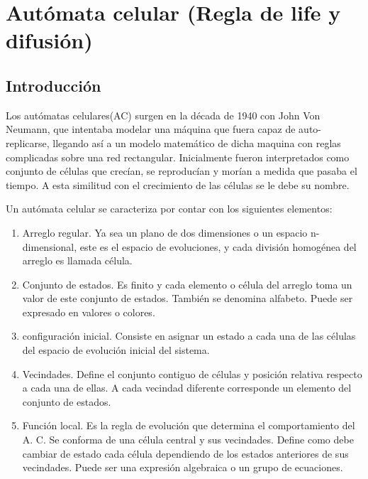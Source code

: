 \section{Autómata celular (Regla de life y difusión)}
\subsection{Introducción}
Los autómatas celulares(AC) surgen en la década de 1940 con John Von Neumann, que intentaba modelar una máquina que fuera capaz de auto-replicarse, llegando así a un modelo matemático de dicha maquina con reglas complicadas sobre una red rectangular. Inicialmente fueron interpretados como conjunto de células que crecían, se reproducían y morían a medida que pasaba el tiempo. A esta similitud con el crecimiento de las células se le debe su nombre.\cite{PAGINA}

Un autómata celular se caracteriza por contar con los siguientes elementos:
\begin{enumerate}
 \item Arreglo regular. Ya sea un plano de dos dimensiones o un espacio n-dimensional, este es el espacio de evoluciones, y cada división homogénea del arreglo es llamada célula.
 \item Conjunto de estados. Es finito y cada elemento o célula del arreglo toma un valor de este conjunto de estados. También se denomina alfabeto. Puede ser expresado en valores o colores.
 \item configuración inicial. Consiste en asignar un estado a cada una de las células del espacio de evolución inicial del sistema.
 \item Vecindades. Define el conjunto contiguo de células y posición relativa respecto a cada una de ellas. A cada vecindad diferente corresponde un elemento del conjunto de estados.
 \item Función local. Es la regla de evolución que determina el comportamiento del A. C. Se conforma de una célula central y sus vecindades. Define como debe cambiar de estado cada célula dependiendo de los estados anteriores de sus vecindades. Puede ser una expresión algebraica o un grupo de ecuaciones.
\end{enumerate}

